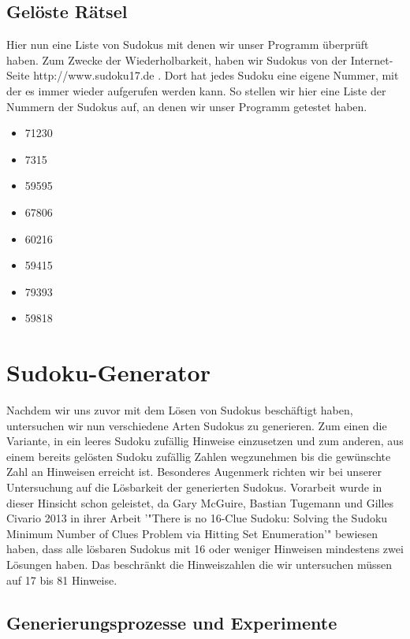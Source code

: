 \documentclass[11pt,a4paper]{article}
\begin{document}
\subsection{Gelöste Rätsel}
Hier nun eine Liste von Sudokus mit denen wir unser Programm  überprüft haben. Zum Zwecke der Wiederholbarkeit, haben wir Sudokus von der Internet-Seite http://www.sudoku17.de . Dort hat jedes Sudoku eine eigene Nummer, mit der es immer wieder aufgerufen werden kann. So stellen wir hier eine Liste der Nummern der Sudokus auf, an denen wir unser Programm getestet haben.
\begin{itemize}
\item 71230
\item 7315
\item 59595
\item 67806
\item 60216
\item 59415
\item 79393
\item 59818
\end{itemize}
\newpage

\section{Sudoku-Generator}
Nachdem wir uns zuvor mit dem Lösen von Sudokus beschäftigt haben,  untersuchen wir nun verschiedene Arten Sudokus zu generieren. Zum einen die Variante, in ein leeres Sudoku zufällig Hinweise einzusetzen und zum anderen, aus einem bereits gelösten Sudoku zufällig Zahlen wegzunehmen bis die gewünschte Zahl an Hinweisen erreicht ist. Besonderes Augenmerk richten wir bei unserer Untersuchung auf die Lösbarkeit der generierten Sudokus. Vorarbeit wurde in dieser Hinsicht schon geleistet, da Gary McGuire, Bastian Tugemann und Gilles Civario 2013 in ihrer Arbeit '"There is no 16-Clue Sudoku: Solving the Sudoku Minimum Number of Clues Problem via Hitting Set Enumeration'" bewiesen haben, dass alle lösbaren Sudokus mit 16 oder weniger Hinweisen mindestens zwei Lösungen haben. Das beschränkt die Hinweiszahlen die wir untersuchen müssen auf 17 bis 81 Hinweise.

\subsection{Generierungsprozesse und Experimente}
\end{document}
